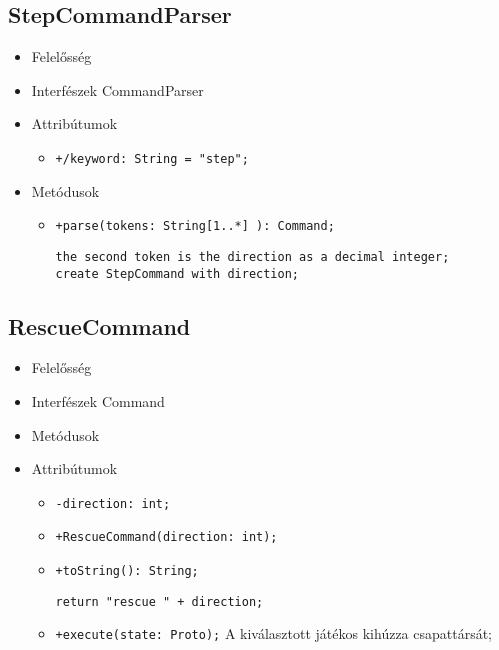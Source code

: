 \subsection{StepCommandParser}
\begin{itemize}
\item Felelősség\newline
\item Interfészek\newline
CommandParser
\item Attribútumok
	\begin{itemize}
		\item \texttt{+/keyword: String = "step";}
	\end{itemize}
\item Metódusok
\begin{itemize}
		\item \texttt{+parse(tokens: String[1..*] ): Command;}
		\begin{lstlisting}
the second token is the direction as a decimal integer;
create StepCommand with direction;
		\end{lstlisting}
	\end{itemize}
\end{itemize}

\subsection{RescueCommand}
\begin{itemize}
\item Felelősség\newline
\item Interfészek\newline
Command
\item Metódusok
\item Attribútumok
	\begin{itemize}
		\item \texttt{-direction: int;}
	\end{itemize}
\begin{itemize}
		\item \texttt{+RescueCommand(direction: int);}
		\item \texttt{+toString(): String;}
		\begin{lstlisting}
return "rescue " + direction;
		\end{lstlisting}
		\item \texttt{+execute(state: Proto);} \newline
		A kiválasztott játékos kihúzza csapattársát;
	\end{itemize}
\end{itemize}
